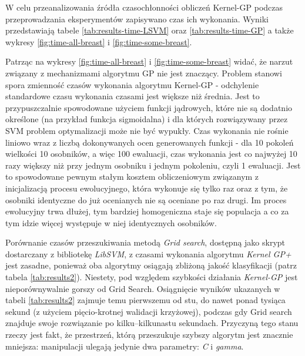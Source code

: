W celu przeanalizowania źródła czasochłonności obliczeń Kernel-GP podczas przeprowadzania eksperymentów zapisywano czas ich wykonania. Wyniki przedstawiają tabele \ref{tab:results-time-LSVM} oraz \ref{tab:results-time-GP} a także wykresy \ref{fig:time-all-breast} i \ref{fig:time-some-breast}.

Patrząc na wykresy \ref{fig:time-all-breast} i \ref{fig:time-some-breast} widać, że narzut związany z mechanizmami algorytmu GP nie jest znaczący. Problem stanowi spora zmienność czasów wykonania algorytmu Kernel-GP - odchylenie standardowe czasu wykonania czasami jest większe niż średnia. Jest to przypuszczalnie spowodowane użyciem funkcji jądrowych, które nie są dodatnio określone (na przykład funkcja sigmoidalna) i dla których rozwiązywany przez SVM problem optymalizacji może nie być wypukły. Czas wykonania nie rośnie liniowo wraz z liczbą dokonywanych ocen generowanych funkcji - dla 10 pokoleń wielkości 10 osobników, a więc 100 ewaluacji, czas wykonania jest co najwyżej 10 razy większy niż przy jednym osobniku i jednym pokoleniu, czyli 1 ewaluacji. Jest to spowodowane pewnym stałym kosztem obliczeniowym  związanym z inicjalizacją procesu ewolucyjnego, która wykonuje się tylko raz oraz z tym, że osobniki identyczne do już ocenianych nie są oceniane po raz drugi. Im proces ewolucyjny trwa dłużej, tym bardziej homogeniczna staje się populacja a co za tym idzie więcej występuje w niej identycznych osobników.

Porównanie czasów przeszukiwania metodą \emph{Grid search}, dostępną jako skrypt dostarczany z bibliotekę \emph{LibSVM}, z czasami wykonania algorytmu \emph{Kernel GP+} jest zasadne, ponieważ oba algorytmy osiągają zbliżoną jakość klasyfikacji (patrz tabela \ref{tab:results2}). Niestety, pod względem szybkości działania \emph{Kernel-GP} jest nieporównywalnie gorszy od Grid Search. Osiągnięcie wyników ukazanych w tabeli \ref{tab:results2} zajmuje temu pierwszemu od stu, do nawet ponad tysiąca sekund (z użyciem pięcio-krotnej walidacji krzyżowej), podczas gdy Grid search znajduje swoje rozwiązanie po kilku--kilkunastu sekundach. Przyczyną tego stanu rzeczy jest fakt, że przestrzeń, którą przeszukuje szybszy algorytm jest znacznie mniejsza: manipulacji ulegają jedynie dwa parametry: \emph{C} i \emph{gamma}.

